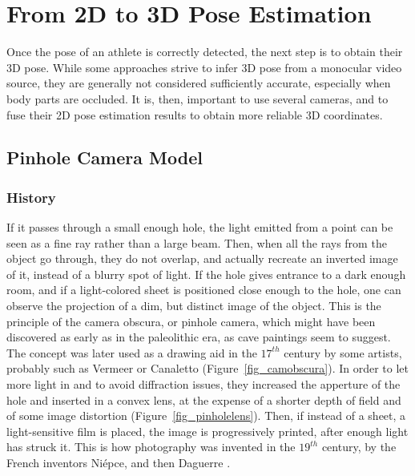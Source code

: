 \FloatBarrier
\section{From 2D to 3D Pose Estimation}\label{sec:3D reconstruction}
\label{ch:2.2}

Once the pose of an athlete is correctly detected, the next step is to obtain their 3D pose. While some approaches strive to infer 3D pose from a monocular video source, they are generally not considered sufficiently accurate, especially when body parts are occluded. It is, then, important to use several cameras, and to fuse their 2D pose estimation results to obtain more reliable 3D coordinates.


\subsection{Pinhole Camera Model}\label{subsec:Pinhole model}

\subsubsection{History}

If it passes through a small enough hole, the light emitted from a point can be seen as a fine ray rather than a large beam. Then, when all the rays from the object go through, they do not overlap, and actually recreate an inverted image of it, instead of a blurry spot of light. If the hole gives entrance to a dark enough room, and if a light-colored sheet is positioned close enough to the hole, one can observe the projection of a dim, but distinct image of the object. This is the principle of the camera obscura, or pinhole camera, which might have been discovered as early as in the paleolithic era, as cave paintings seem to suggest. The concept was later used as a drawing aid in the $17^{th}$ century by some artists, probably such as Vermeer or Canaletto \cite{Steadman2001} (Figure~\ref{fig_camobscura}). In order to let more light in and to avoid diffraction issues, they increased the apperture of the hole and inserted in a convex lens, at the expense of a shorter depth of field and of some image distortion (Figure~\ref{fig_pinholelens}). Then, if instead of a sheet, a light-sensitive film is placed, the image is progressively printed, after enough light has struck it. This is how photography was invented in the $19^{th}$ century, by the French inventors Niépce, and then Daguerre \cite{Marignier1999}.

